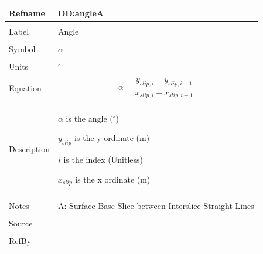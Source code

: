 \documentclass[12pt]{article}
\begin{document}
\noindent \begin{minipage}{\textwidth}
\begin{tabular}{p{} p{}}
\toprule \textbf{Refname} & \textbf{DD:angleA}
\label{DD:angleA}
\\ \midrule \\
Label & Angle
        \\ \midrule \\
        Symbol & $α$
                 \\ \midrule \\
                 Units & ${}^{\circ}$
                         \\ \midrule \\
                         Equation & \begin{displaymath}
                                    α=\frac{{y_{slip,i}}-{y_{slip,i-1}}}{{x_{slip,i}}-{x_{slip,i-1}}}
                                    \end{displaymath}
                                    \\ \midrule \\
                                    Description & \begin{symbDescription}
                                                  \item{$α$ is the angle (${}^{\circ}$)}
                                                  \item{${y_{slip}}$ is the y ordinate (m)}
                                                  \item{$i$ is the index (Unitless)}
                                                  \item{${x_{slip}}$ is the x ordinate (m)}
                                                  \end{symbDescription}
                                                  \\ \midrule \\
                                                  Notes & \hyperref[A:Surface-Base-Slice-between-Interslice-Straight-Lines]{A: Surface-Base-Slice-between-Interslice-Straight-Lines}
                                                          \\ \midrule \\
                                                          Source & \cite{fredlund1977}
                                                                   \\ \midrule \\
                                                                   RefBy & 
\\ \bottomrule \end{tabular}
\end{minipage}
\par~
\end{document}

